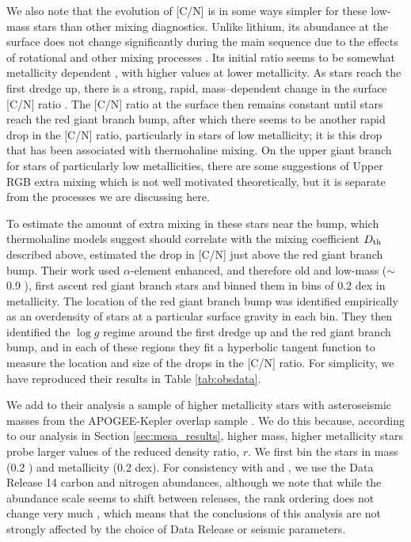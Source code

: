 We also note that the evolution of [C/N] is in some ways simpler for these low-mass stars than other mixing diagnostics. Unlike lithium, its abundance at the surface does not change significantly during the main sequence due to the effects of rotational and other mixing processes \citep{Iben1967}. Its initial ratio seems to be somewhat metallicity dependent \citep{Shetrone2019}%
, with higher values at lower metallicity. As stars reach the first dredge up, there is a strong, rapid, mass--dependent change in the surface [C/N] ratio \citep{MasseronGilmore2015, Martig2016, Ness2016, Spoo2022}. The [C/N] ratio at the surface then remains constant until stars reach the red giant branch bump, after which there seems to be another rapid drop in the [C/N] ratio, particularly in stars of low metallicity; it is this drop that has been associated with thermohaline mixing. On the upper giant branch for stars of particularly low metallicities, there are some suggestions of Upper RGB extra mixing \citep{Shetrone2019} which is not well motivated theoretically, but it is separate from the processes we are discussing here.

To estimate the amount of extra mixing in these stars near the bump, which thermohaline models suggest should correlate with the %
mixing coefficient $D_\mathrm{th}$ described above, %
\citet{Shetrone2019} estimated the drop in [C/N] just above the red giant branch bump. Their work used $\alpha$-element enhanced, and therefore old and low-mass ($\sim$0.9 \msun), first ascent red giant branch stars and binned them in bins of 0.2 dex in metallicity. The location of the red giant branch bump was identified empirically as an overdensity of stars at a particular surface gravity in each bin. They then identified the %
$\log g$ regime around the first dredge up and the red giant branch bump, and in each of these regions they fit a hyperbolic tangent function to measure the location and size of the drops in the [C/N] ratio. For simplicity, we have reproduced their results in Table \ref{tab:obsdata}. 

We add to their analysis a sample of higher metallicity stars with asteroseismic masses from the APOGEE-Kepler overlap sample \citep[APOKASC,][]{Pinsonneault2014, Pinsonneault2018}. We do this because, according to our analysis in Section \ref{sec:mesa_results}, higher mass, higher metallicity stars probe larger values of the reduced density ratio, $r$. %
We first bin the stars in mass (0.2 \msun) and  metallicity (0.2 dex). For consistency with \citet{Pinsonneault2018} and \citet{Shetrone2019}, we use the Data Release 14 \citet{DR14} carbon and nitrogen abundances, although we note that while the abundance scale seems to shift between releases, the rank ordering does not change very much \citep{Spoo2022}, which means that the conclusions of this analysis are not strongly affected by the choice of Data Release or seismic parameters.

